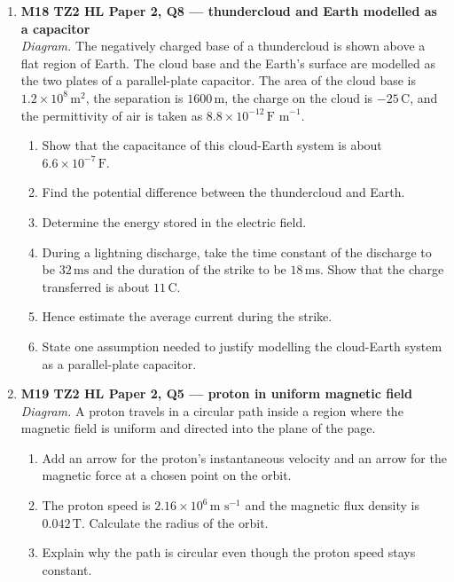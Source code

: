 \documentclass[11pt]{article}
\begin{document}
\begin{enumerate}[leftmargin=*, itemsep=1.1em]
\item \textbf{M18 TZ2 HL Paper 2, Q8 --- thundercloud and Earth modelled as a capacitor}\\
\textit{Diagram.} The negatively charged base of a thundercloud is shown above a flat region of Earth. The cloud base and the Earth's surface are modelled as the two plates of a parallel-plate capacitor. The area of the cloud base is $1.2\times10^{8}\,\text{m}^2$, the separation is $1600\,\text{m}$, the charge on the cloud is $-25\,\text{C}$, and the permittivity of air is taken as $8.8\times10^{-12}\,\text{F m}^{-1}$.
\begin{enumerate}[label=(\alph*)]
\item Show that the capacitance of this cloud-Earth system is about $6.6\times10^{-7}\,\text{F}$.
\item Find the potential difference between the thundercloud and Earth.
\item Determine the energy stored in the electric field.
\item During a lightning discharge, take the time constant of the discharge to be $32\,\text{ms}$ and the duration of the strike to be $18\,\text{ms}$. Show that the charge transferred is about $11\,\text{C}$.
\item Hence estimate the average current during the strike.
\item State one assumption needed to justify modelling the cloud-Earth system as a parallel-plate capacitor.
\end{enumerate}

\item \textbf{M19 TZ2 HL Paper 2, Q5 --- proton in uniform magnetic field}\\
\textit{Diagram.} A proton travels in a circular path inside a region where the magnetic field is uniform and directed into the plane of the page.
\begin{enumerate}[label=(\alph*)]
\item Add an arrow for the proton's instantaneous velocity and an arrow for the magnetic force at a chosen point on the orbit.
\item The proton speed is $2.16\times10^{6}\,\text{m s}^{-1}$ and the magnetic flux density is $0.042\,\text{T}$. Calculate the radius of the orbit.
\item Explain why the path is circular even though the proton speed stays constant.
\end{enumerate}


\end{enumerate}
\end{document}
